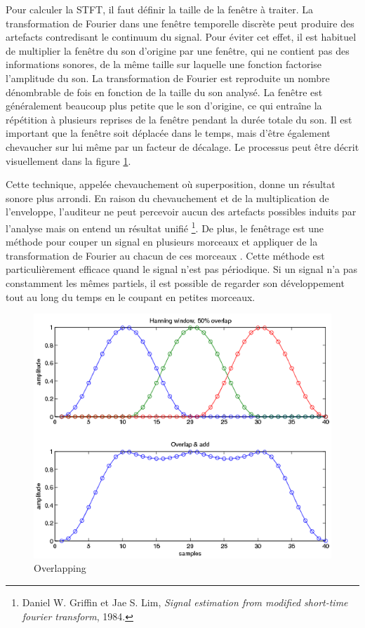 Pour calculer la STFT, il faut définir la taille de la fenêtre à traiter. La transformation de Fourier dans une fenêtre temporelle discrète peut produire des artefacts contredisant le continuum du signal. Pour éviter cet effet, il est habituel de multiplier la fenêtre du son d'origine par une fenêtre, qui ne contient pas des informations sonores, de la même taille sur laquelle une fonction factorise l'amplitude du son. La transformation de Fourier est reproduite un nombre dénombrable de fois en fonction de la taille du son analysé. La fenêtre est généralement beaucoup plus petite que le son d'origine, ce qui entraîne la répétition à plusieurs reprises de la fenêtre pendant la durée totale du son. Il est important que la fenêtre soit déplacée dans le temps, mais d’être également chevaucher sur lui même par un facteur de décalage. Le processus peut être décrit visuellement dans la figure \ref{overlapping}.

Cette technique, appelée chevauchement où superposition, donne un résultat sonore plus arrondi. En raison du chevauchement et de la multiplication de l'enveloppe, l'auditeur ne peut percevoir aucun des artefacts possibles induits par l'analyse mais on entend un résultat unifié \footnote {Daniel W. Griffin et Jae S. Lim, \textit{Signal estimation from modified short-time fourier transform}, 1984. \nocite{GrL84}}. De plus, le fenêtrage est une méthode pour couper un signal en plusieurs morceaux et appliquer de la transformation de Fourier au chacun de ces morceaux . Cette méthode est particulièrement efficace quand le signal n'est pas périodique. Si un signal n'a pas constamment les mêmes partiels, il est possible de regarder son développement tout au long du temps en le coupant en petites morceaux.
 
         \begin{figure}
            \centering
            \includegraphics[width = 0.5 \textwidth ]{Graphs/Overlapping.png}
            \caption{Overlapping}
            \label{overlapping}
        \end{figure}

